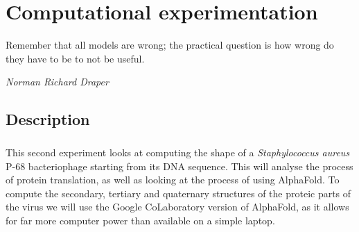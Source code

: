 \chapter{Computational experimentation}
\epigraph{Remember that all models are wrong; the practical question is how wrong do they have to be to not be useful.}{\textit{Norman Richard Draper}}
\section{Description}
\paragraph{}This second experiment looks at computing the shape of a \emph{Staphylococcus aureus} P-68 bacteriophage starting from its DNA sequence. This will analyse the process of protein translation, as well as looking at the process of using AlphaFold\cite{jumperHighlyAccurateProtein2021}. To compute the secondary, tertiary and quaternary structures of the proteic parts of the virus we will use the Google CoLaboratory version of AlphaFold\cite{GoogleColaboratoryAlpha1970}, as it allows for far more computer power than available on a simple laptop.
